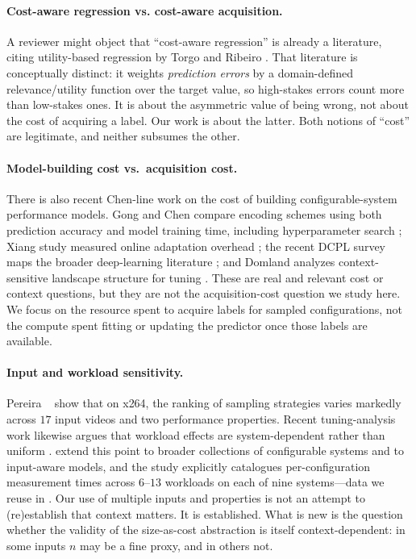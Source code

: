 \paragraph*{Cost-aware regression vs. cost-aware acquisition.}
A reviewer might object that ``cost-aware regression'' is already a
literature, citing utility-based regression by Torgo and Ribeiro
. That literature is conceptually distinct: it
weights \emph{prediction errors} by a domain-defined relevance/utility
function over the target value, so high-stakes errors count more than
low-stakes ones. It is about the asymmetric value of being wrong, not
about the cost of acquiring a label. Our work is about the latter. Both
notions of ``cost'' are legitimate, and neither subsumes the other.

\paragraph*{Model-building cost vs.\ acquisition cost.}
There is also recent Chen-line work on the cost of building configurable-system
performance models. Gong and Chen compare encoding schemes using both
prediction accuracy and model training time, including hyperparameter search
\cite{gong2022encoding}; Xiang \etal{} study measured online adaptation
overhead \cite{xiang2026dhda}; the recent DCPL survey maps the broader
deep-learning literature \cite{gong2024dcpl}; and Domland analyzes
context-sensitive landscape structure for tuning \cite{ye2026domland}. These
are real and relevant cost or context questions, but they are not the
acquisition-cost question we study here. We focus on the resource spent to
acquire labels for sampled configurations, not the compute spent fitting or
updating the predictor once those labels are available.

\paragraph*{Input and workload sensitivity.}
Pereira \etal~\cite{pereira2020} show that on x264, the ranking of sampling
strategies varies markedly across $17$ input videos and two performance
properties. Recent tuning-analysis work likewise argues that workload effects
are system-dependent rather than uniform \cite{ye2026domland}.
 extend this point to broader collections of
configurable systems and to input-aware models, and the \dsWLI
study explicitly catalogues per-configuration measurement times across
$6$--$13$ workloads on each of nine systems---data we reuse in
. Our use of multiple inputs and properties is not an
attempt to (re)establish that context matters. It is established. What is
new is the question whether the validity of the size-as-cost abstraction is
itself context-dependent: in some inputs $n$ may be a fine proxy, and in
others not.


